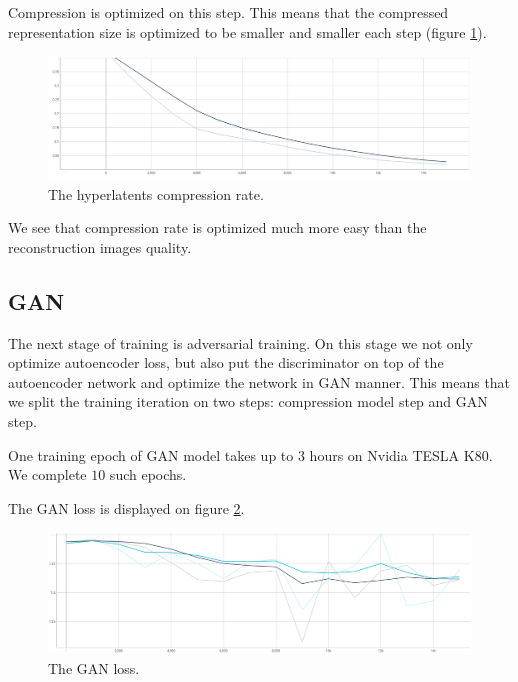 Compression is optimized on this step. This means that the compressed representation size is optimized to be smaller and smaller each step (figure \ref{training-compression-q-rate}).

\begin{figure}[!ht]
    \centering
    \includegraphics[width=\textwidth]{figure/compression-q-rate-hyperlatent.png}
    \caption{The hyperlatents compression rate.}
    \label{training-compression-q-rate}
\end{figure}

We see that compression rate is optimized much more easy than the reconstruction images quality.

\subsection{GAN}

The next stage of training is adversarial training. On this stage we not only optimize autoencoder loss, but also put the discriminator on top of the autoencoder network and optimize the network in GAN manner. This means that we split the training iteration on two steps: compression model step and GAN step.

One training epoch of GAN model takes up to $3$ hours on Nvidia TESLA K80. We complete $10$ such epochs.

The GAN loss is displayed on figure \ref{training-compression-gan-discriminator}.

\begin{figure}[!ht]
    \centering
    \includegraphics[width=\textwidth]{figure/compression-gan-discriminator.png}
    \caption{The GAN loss.}
    \label{training-compression-gan-discriminator}
\end{figure}

